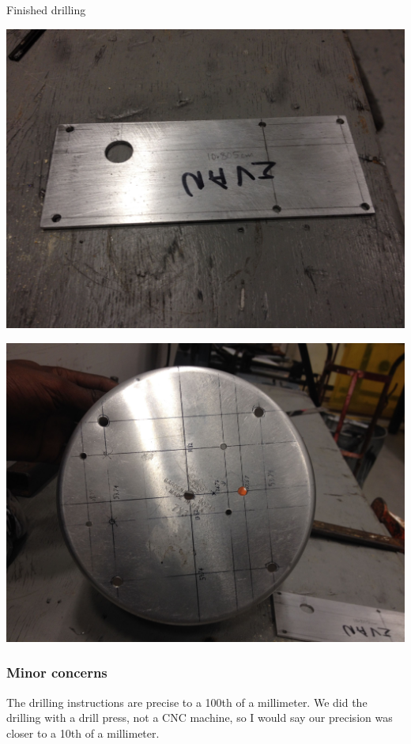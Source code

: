 \documentclass[11pt]{article} %
\begin{document}
Finished drilling

\begin{center}
\includegraphics[scale=0.10]{feed/06.jpeg}
\end{center}

\begin{center}
\includegraphics[scale=0.11]{feed/07.jpeg}
\end{center}

\subsubsection{Minor concerns}
The drilling instructions are precise to a 100th of a millimeter. We did the drilling with a drill press, not a CNC machine, so I would say our precision was closer to a 10th of a millimeter.
\end{document}
